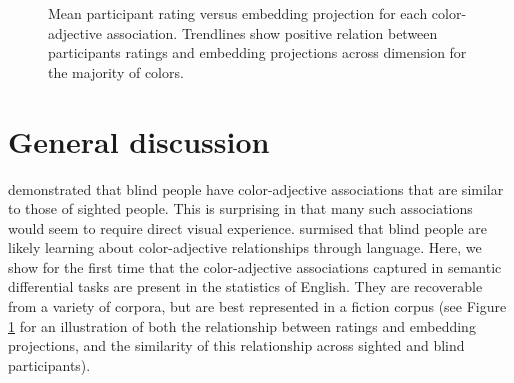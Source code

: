 \documentclass[10pt,letterpaper]{article}
\begin{document}
\begin{figure}[ht!]
\begin{center}
\caption{Mean participant rating versus embedding projection for each color-adjective association. Trendlines show positive relation between participants ratings and embedding projections across dimension for the majority of colors.}
\label{scatter_color}
\end{center}
\end{figure}

\section{General discussion}
 demonstrated that blind people have color-adjective associations that are similar to those of sighted people. This is surprising in that many such associations would seem to require direct visual experience. \citeauthor{saysani2021seeing} surmised that blind people are likely learning about color-adjective relationships through language. Here, we show for the first time that the color-adjective associations captured in semantic differential tasks are present in the statistics of English. They are recoverable from a variety of corpora, but are best represented in a fiction corpus (see Figure \ref{scatter_color} for an illustration of both the relationship between ratings and embedding projections, and the similarity of this relationship across sighted and blind participants). 
\end{document}
